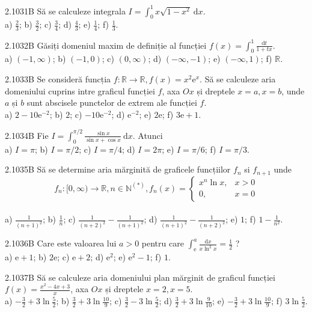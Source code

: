 \documentclass[11pt]{article}
\begin{document}
2.1031B Să se calculeze integrala $I=\int_{0}^{1} x \sqrt{1-x^{2}} \mathrm{~d} x$.\\ a) $\frac{2}{3}$; b) $\frac{3}{2}$; c) $\frac{3}{4}$; d) $\frac{4}{3}$; e) $\frac{1}{4}$; f) $\frac{1}{3}$.

2.1032B Găsiți domeniul maxim de definiție al funcției $f(x)=\int_{0}^{1} \frac{\mathrm{d} t}{1+t x}$.\\ a) $(-1, \infty)$; b) $(-1,0)$; c) $(0, \infty)$; d) $(-\infty,-1)$; e) $(-\infty, 1)$; f) $\mathbb{R}$.

2.1033B Se consideră funcția $f: \mathbb{R} \rightarrow \mathbb{R}, f(x)=x^{2} \mathrm{e}^{x}$. Să se calculeze aria domeniului cuprins intre graficul funcției $f$, axa $O x$ și dreptele $x=a, x=b$, unde $a$ și $b$ sunt abscisele punctelor de extrem ale funcției $f$.\\ a) $2-10 \mathrm{e}^{-2}$; b) $2$; c) $-10 \mathrm{e}^{-2}$; d) $\mathrm{e}^{-2}$; e) $2 \mathrm{e}$; f) $3 \mathrm{e}+1$.

2.1034B Fie $I=\int_{0}^{\pi / 2} \frac{\sin x}{\sin x+\cos x} \mathrm{~d} x$. Atunci\\ a) $I=\pi$; b) $I=\pi / 2$; c) $I=\pi / 4$; d) $I=2 \pi$; e) $I=\pi / 6$; f) $I=\pi / 3$.

2.1035B Să se determine aria mărginită de graficele funcțiilor $f_{n}$ si $f_{n+1}$ unde $$f_{n}:[0, \infty) \rightarrow \mathbb{R}, n \in \mathbb{N}^{(*)}, f_{n}(x)= \begin{cases}x^{n} \ln x, & x>0 \\ 0, & x=0\end{cases}$$\\ a) $\frac{1}{(n+1)^{2}}$; b) $\frac{1}{n}$; c) $\frac{1}{(n+2)^{2}}-\frac{1}{(n+1)^{2}}$; d) $\frac{1}{(n+1)^{2}}-\frac{1}{(n+2)^{2}}$; e) $1$; f) $1-\frac{1}{n^{2}}$.

2.1036B Care este valoarea lui $a>0$ pentru care $\int_{\mathrm{e}}^{a} \frac{\mathrm{d} x}{x \ln ^{2} x}=\frac{1}{2}$ ?\\ a) $\mathrm{e}+1$; b) $2 \mathrm{e}$; c) $\mathrm{e}+2$; d) $\mathrm{e}^{2}$; e) $\mathrm{e}^{2}-1$; f) $1$.

2.1037B Să se calculeze aria domeniului plan mărginit de graficul funcției $f(x)=\frac{x^{2}-4 x+3}{x}$, axa $O x$ și dreptele $x=2, x=5$.\\ a) $-\frac{3}{2}+3 \ln \frac{5}{2}$; b) $\frac{3}{2}+3 \ln \frac{10}{9}$; c) $\frac{3}{2}-3 \ln \frac{5}{2}$; d) $\frac{3}{2}+3 \ln \frac{9}{10}$; e) $-\frac{3}{2}+3 \ln \frac{10}{9}$; f) $3 \ln \frac{5}{2}$.
\end{document}
